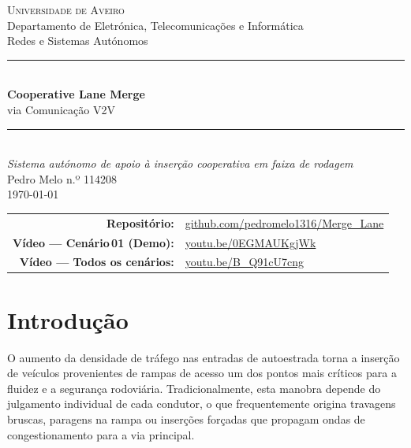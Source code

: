 \documentclass[11pt,a4paper]{article}
\begin{document}
\begin{titlepage}
  \centering
  \vspace*{1.5cm}
  {\Large\textsc{Universidade de Aveiro}}\\[0.3cm]
  {\large Departamento de Eletrónica, Telecomunicações e Informática}\\[2.5cm]

  {\large Redes e Sistemas Autónomos}\\[1.5cm]

  \rule{\linewidth}{0.4mm}\\[0.6cm]
  {\Huge\bfseries Cooperative Lane Merge\\[0.3cm]}
  {\Large via Comunicação V2V}\\[0.4cm]
  \rule{\linewidth}{0.4mm}\\[1.5cm]

  {\large\itshape Sistema autónomo de apoio à inserção cooperativa em faixa de rodagem}\\[3cm]

  {\large Pedro Melo \quad n.º 114208}\\[2cm]

  {\large \today}\\[1cm]

  \begin{tabular}{rl}
    \textbf{Repositório:} & \href{https://github.com/pedromelo1316/Merge_Lane}{\color{blue}github.com/pedromelo1316/Merge\_Lane} \\[0.2cm]
    \textbf{Vídeo — Cenário\,01 (Demo):} & \href{https://youtu.be/0EGMAUKgjWk}{\color{blue}youtu.be/0EGMAUKgjWk} \\[0.2cm]
    \textbf{Vídeo — Todos os cenários:} & \href{https://youtu.be/B_Q91cU7cng}{\color{blue}youtu.be/B\_Q91cU7cng} \\
  \end{tabular}
\end{titlepage}

\tableofcontents
\newpage

\section{Introdução}
\label{sec:intro}

O aumento da densidade de tráfego nas entradas de autoestrada torna a inserção de
veículos provenientes de rampas de acesso um dos pontos mais críticos para a fluidez
e a segurança rodoviária. Tradicionalmente, esta manobra depende do julgamento
individual de cada condutor, o que frequentemente origina travagens bruscas, paragens
na rampa ou inserções forçadas que propagam ondas de congestionamento para a via
principal.
\end{document}
